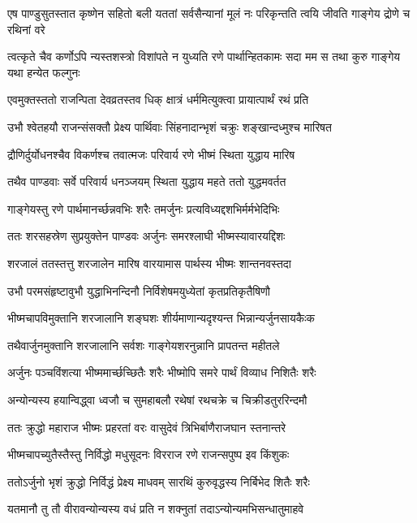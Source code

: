 \threelineshloka
{एष पाण्डुसुतस्तात कृष्णेन सहितो बली}
{यततां सर्वसैन्यानां मूलं नः परिकृन्तति}
{त्वयि जीवति गाङ्गेय द्रोणे च रथिनां वरे}


\threelineshloka
{त्वत्कृते चैव कर्णोऽपि न्यस्तशस्त्रो विशांपते}
{न युध्यति रणे पार्थान्हितकामः सदा मम}
{स तथा कुरु गाङ्गेय यथा हन्येत फल्गुनः}


\twolineshloka
{एवमुक्तस्ततो राजन्पिता देवव्रतस्तव}
{धिक् क्षात्रं धर्ममित्युक्त्वा प्रायात्पार्थं रथं प्रति}


\twolineshloka
{उभौ श्वेतहयौ राजन्संसक्तौ प्रेक्ष्य पार्थिवाः}
{सिंहनादान्भृशं चक्रुः शङ्खान्दध्मुश्च मारिषत}


\twolineshloka
{द्रौणिर्दुर्योधनश्चैव विकर्णश्च तवात्मजः}
{परिवार्य रणे भीष्मं स्थिता युद्धाय मारिष}


\twolineshloka
{तथैव पाण्डवाः सर्वे परिवार्य धनञ्जयम्}
{स्थिता युद्धाय महते ततो युद्धमवर्तत}


\twolineshloka
{गाङ्गेयस्तु रणे पार्थमानर्च्छन्नवभिः शरैः}
{तमर्जुनः प्रत्यविध्यद्दशभिर्मर्मभेदिभिः}


\twolineshloka
{ततः शरसहस्रेण सुप्रयुक्तेन पाण्डवः}
{अर्जुनः समरश्लाघी भीष्मस्यावारयद्दिशः}


\twolineshloka
{शरजालं ततस्तत्तु शरजालेन मारिष}
{वारयामास पार्थस्य भीष्मः शान्तनवस्तदा}


\twolineshloka
{उभौ परमसंहृष्टावुभौ युद्धाभिनन्दिनौ}
{निर्विशेषमयुध्येतां कृतप्रतिकृतैषिणौ}


\twolineshloka
{भीष्मचापविमुक्तानि शरजालानि शङ्घशः}
{शीर्यमाणान्यदृश्यन्त भिन्नान्यर्जुनसायकैःक}


\twolineshloka
{तथैवार्जुनमुक्तानि शरजालानि सर्वशः}
{गाङ्गेयशरनुन्नानि प्रापतन्त महीतले}


\threelineshloka
{अर्जुनः पञ्चविंशत्या भीष्ममार्च्छच्छितैः शरैः}
{भीष्मोपि समरे पार्थं विव्याध निशितैः शरैः}
{}


\twolineshloka
{अन्योन्यस्य हयान्विद्ध्वा ध्वजौ च सुमहाबलौ}
{रथेषां रथचक्रे च चिक्रीडतुररिन्दमौ}


\twolineshloka
{ततः क्रुद्धो महाराज भीष्मः प्रहरतां वरः}
{वासुदेवं त्रिभिर्बाणैराजघान स्तनान्तरे}


\twolineshloka
{भीष्मचापच्युतैस्तैस्तु निर्विद्धो मधुसूदनः}
{विरराज रणे राजन्सपुष्प इव किंशुकः}


\twolineshloka
{ततोऽर्जुनो भृशं क्रुद्धो निर्विद्धं प्रेक्ष्य माधवम्}
{सारथिं कुरुवृद्धस्य निर्बिभेद शितैः शरैः}


\twolineshloka
{यतमानौ तु तौ वीरावन्योन्यस्य वधं प्रति}
{न शक्नुतां तदाऽन्योन्यमभिसन्धातुमाहवे}


